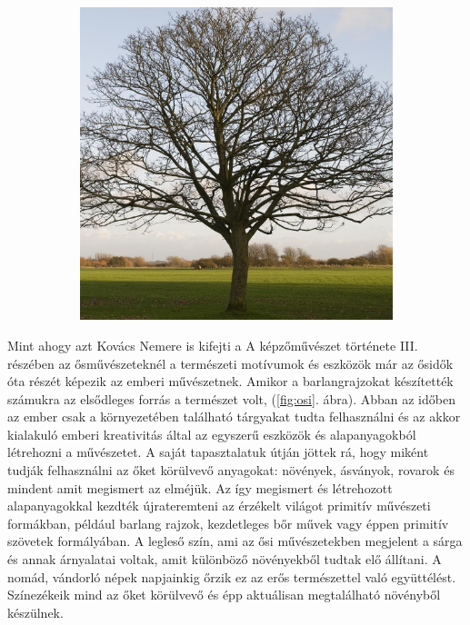 \begin{figure}[ht!]
\begin{subfigure}[b]{0.225\textwidth}
		\caption{}    
	\end{subfigure}
	\hspace{10 mm}
	\begin{subfigure}[b]{0.225\textwidth}   
		\centering 
		\includegraphics[width=\textwidth]{img/nat_pat_04.jpg}
		\caption{}  
	\end{subfigure}
	\caption{}
	\label{fig:nat_pet}
\end{figure}

Mint ahogy azt Kovács Nemere is kifejti a A képzőművészet története III. részében az ősművészeteknél \cite{nemerekepzHomHuveszet} a természeti motívumok és eszközök már az ősidők óta részét képezik az emberi művészetnek. Amikor a barlangrajzokat készítették számukra az elsődleges forrás a természet volt, (\ref{fig:osi}. ábra).
Abban az időben az ember csak a környezetében található tárgyakat tudta felhasználni és az akkor kialakuló emberi kreativitás által az egyszerű eszközök és alapanyagokból létrehozni a művészetet. A saját tapasztalatuk útján jöttek rá, hogy miként tudják felhasználni az őket körülvevő anyagokat: növények, ásványok, rovarok és mindent amit megismert az elméjük. Az így megismert és létrehozott alapanyagokkal kezdték újrateremteni az érzékelt világot primitív művészeti formákban, például barlang rajzok, kezdetleges bőr művek vagy éppen primitív szövetek formályában. A legleső szín, ami az ősi művészetekben megjelent a sárga és annak árnyalatai voltak, amit különböző növényekből tudtak elő állítani.
A nomád, vándorló népek napjainkig őrzik ez az erős természettel való együttélést. Színezékeik mind az őket körülvevő és épp aktuálisan megtalálható növényből készülnek.

